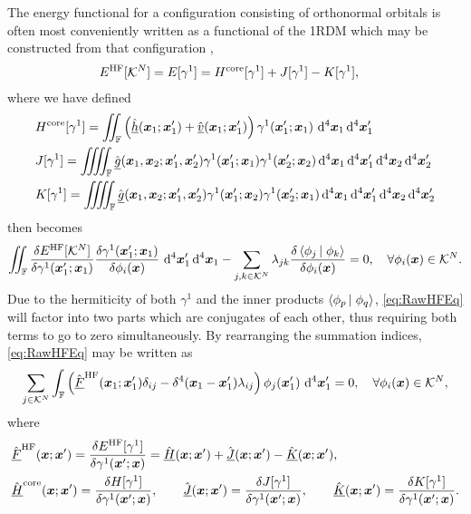 The energy functional for a configuration consisting of orthonormal orbitals is often most conveniently 
written as a functional of the 1RDM which may be constructed from that configuration \cite{Yang89_book},
\begin{align}
&E^\mathrm{HF}[\mathcal{K}^N] = E[\gamma^1] = H^{\mathrm{core}}[\gamma^1] + J[\gamma^1] - K[\gamma^1],
\end{align}
where we have defined
\begin{align}
  &H^\core[\gamma^1] = 
    \iint_\mathbb{F} \left( \spop{h}(\vc{x}_1; \vc{x}_1') + \spop{v}(\vc{x}_1; \vc{x}_1')\right) \gamma^1(\vc{x}'_1; \vc{x}_1) \, \dd^4\vc{x}_1 \dd^4\vc{x}'_1\,\,  \label{eq:CoreFunc}
    \\
  &J[\gamma^1] = \iiiint_\mathbb{F} \spop{g}(\vc{x}_1, \vc{x}_2; \vc{x}_1', \vc{x}_2') 
      \gamma^1(\vc{x}'_1; \vc{x}_1)\gamma^1(\vc{x}'_2; \vc{x}_2) 
    \dd^4\vc{x}_1 \dd^4\vc{x}'_1\dd^4\vc{x}_2 \dd^4\vc{x}'_2 \label{eq:ClassCoulFunc}\\
  &K[\gamma^1] = \iiiint_\mathbb{F} \spop{g}(\vc{x}_1, \vc{x}_2; \vc{x}_1', \vc{x}_2') 
      \gamma^1(\vc{x}'_1; \vc{x}_2)\gamma^1(\vc{x}'_2; \vc{x}_1) 
    \dd^4\vc{x}_1 \dd^4\vc{x}'_1\dd^4\vc{x}_2 \dd^4\vc{x}'_2 
\end{align}
 then becomes
\begin{equation}
    \label{eq:RawHFEq}
    \int\mkern-12mu\int_{\mathbb F}\frac{\delta E^\mathrm{HF}[\mathcal{K}^N]}{\delta \gamma^{1} (\boldsymbol{x}'_1; \boldsymbol{x}_1)} \frac{\delta \gamma^{1}(\boldsymbol{x}'_1; \boldsymbol{x}_1)}{\delta \phi_i(\boldsymbol{x})} \,\,\mathrm{d}^4\boldsymbol{x}'_1 \,\mathrm{d}^4 \boldsymbol{x}_1 - 
    \sum_{j,k \in \mathcal{K}^N} \lambda_{jk} \frac{\delta \left\langle \phi_j \left\vert\right. \phi_k \right\rangle}{\delta \phi_i(\boldsymbol{x})}  = 0 ,\quad \forall \phi_i(\boldsymbol{x}) \in \mathcal{K}^N.
\end{equation}
Due to the hermiticity of both $\gamma^1$ and the inner products $\left\langle \phi_p \left\vert\right. \phi_q \right\rangle$, \cref{eq:RawHFEq} will factor into two parts which are 
conjugates of each other, thus requiring both terms to go to zero simultaneously. By rearranging the summation indices, \cref{eq:RawHFEq} may be written as
\begin{align}
  \label{eq:HFNonCan}
  \sum_{j \in \mathcal{K}^N}
  \int_{\mathbb F} \left( \hat{\underline{F}}^{\mathrm{HF}}(\boldsymbol{x}_1; \boldsymbol{x}_1')\delta_{ij}   - \delta^4(\boldsymbol{x} _1- \boldsymbol{x}_1')\lambda_{ij} \right)
    \phi_j(\boldsymbol{x}_1')\,\,\mathrm{d}^4\boldsymbol{x}_1' = 0 ,\quad \forall \phi_i(\boldsymbol{x}) \in \mathcal{K}^N,
\end{align}
where
\begin{align}
  \label{eq:HFFockSpace}
&\hat{\underline{F}}^{\mathrm{HF}}(\boldsymbol{x}; \boldsymbol{x}') = 
  \frac{\delta E^\mathrm{HF}[\gamma^1]}{\delta \gamma^{1}(\boldsymbol{x}'; \boldsymbol{x})} = \hat{\underline{H}}(\boldsymbol{x};\boldsymbol{x}') + \hat{\underline{J}}(\boldsymbol{x};\boldsymbol{x}') - \hat{\underline{K}}(\boldsymbol{x};\boldsymbol{x}'),\\
&\hat{\underline{H}}^{\mathrm{core}}(\boldsymbol{x}; \boldsymbol{x}') = \frac{\delta H[\gamma^1]}{\delta \gamma^1(\boldsymbol{x}'; \boldsymbol{x})},\qquad 
\hat{\underline{J}}(\boldsymbol{x}; \boldsymbol{x}') = \frac{\delta J[\gamma^1]}{\delta \gamma^1(\boldsymbol{x}'; \boldsymbol{x})}, \qquad
\hat{\underline{K}}(\boldsymbol{x}; \boldsymbol{x}') = \frac{\delta K[\gamma^1]}{\delta \gamma^1(\boldsymbol{x}'; \boldsymbol{x})} . \label{eq:FockComponents}
\end{align}
